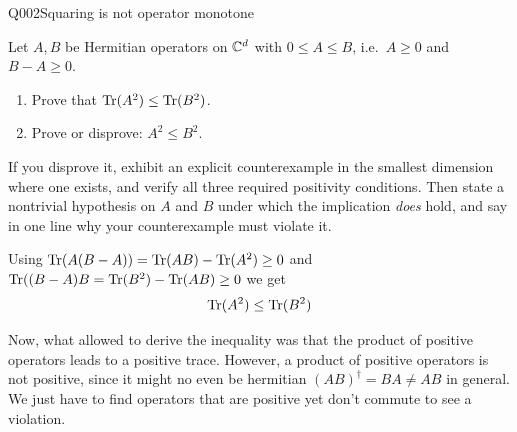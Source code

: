 \begin{entry}{Q002}{Squaring is not operator monotone}


\begin{problem}
Let $A,B$ be Hermitian operators on $\mathbb{C}^{d}$ with $0\le A\le B$, i.e.\ $A\ge 0$ and
$B-A\ge 0$.
\begin{enumerate}[label=\textbf{(\alph*)},leftmargin=*]
  \item Prove that $\operatorname{Tr}(A^{2})\le\operatorname{Tr}(B^{2})$.
  \item Prove or disprove: $A^{2}\le B^{2}$.
\end{enumerate}
If you disprove it, exhibit an explicit counterexample in the smallest dimension where
one exists, and verify all three required positivity conditions. Then state a nontrivial
hypothesis on $A$ and $B$ under which the implication \emph{does} hold, and say in one
line why your counterexample must violate it.
\end{problem}

\begin{solution}[Part (a)]
Using  $\operatorname{Tr}(A(B-A))= \operatorname{Tr}(AB)-\operatorname{Tr}(A^2)\geq 0$ and $\operatorname{Tr}((B-A)B= \operatorname{Tr}(B^2)-\operatorname{Tr}(AB) \geq 0$ we get $$\operatorname{Tr}(A^{2})\le\operatorname{Tr}(B^{2})$$ 
\end{solution}

\begin{solution}[Part (b)]
Now, what allowed to derive the inequality was that the product of positive operators leads to a positive trace. However, a product of positive operators is not positive, since it might no even be hermitian $(AB)^\dagger=BA  \neq AB$ in general. We just have to find operators that are positive yet don't commute to see a violation. 


\end{solution}
\end{entry}

